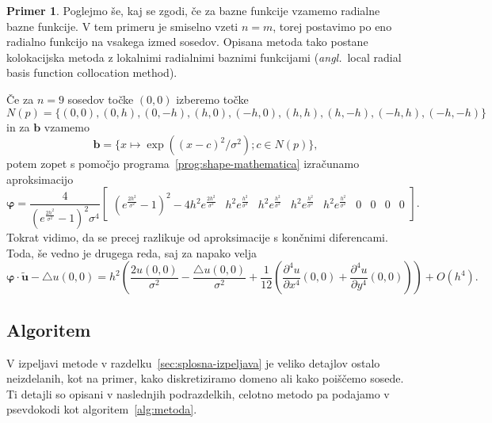 \documentclass[12pt,a4paper]{article}
\theoremstyle{definition} %
\newtheorem{primer}[definicija]{Primer}
\theoremstyle{plain} %
\numberwithin{equation}{section}
\renewcommand{\b}{\boldsymbol}
\renewcommand{\phi}{\varphi}
\newcommand{\dpar}[2]{\ensuremath{\frac{\partial #1}{\partial #2}}}
\newcommand{\ang}[1]{(\textit{angl.}\ #1)}
\begin{document}
\begin{primer}
\label{prim:rbf}
Poglejmo še, kaj se zgodi, če za bazne funkcije vzamemo radialne bazne funkcije.
V tem primeru je smiselno vzeti $n = m$, torej postavimo po eno radialno funkcijo
na vsakega izmed sosedov. Opisana metoda tako postane kolokacijska metoda z
lokalnimi radialnimi baznimi funkcijami \ang{local radial basis function
collocation method}.

Če za $n = 9$ sosedov točke $(0, 0)$ izberemo točke \[ N(p) = \{
  (0, 0), (0, h), (0, -h), (h, 0), (-h, 0), (h, h), (h, -h), (-h, h), (-h, -h)
\} \] in za $\b b$ vzamemo \[ \b b = \{ x\mapsto \exp((x-c)^2/\sigma^2); c \in N(p)
\}, \]
potem zopet s
pomočjo programa~\ref{prog:shape-mathematica} izračunamo aproksimacijo
\small
\[
  \b\phi =\frac{4}{(e^{\frac{2 h^2}{\sigma^2 }}-1)^2 \sigma^4}
\begin{bmatrix}
  (e^{\frac{2 h^2}{\sigma^2 }}-1)^2 -4h^2 e^{\frac{2 h^2}{\sigma^2 }} &
   h^2e^{\frac{h^2}{\sigma^2 }} & h^2e^{\frac{h^2}{\sigma^2 }} &
   h^2e^{\frac{h^2}{\sigma^2 }} & h^2e^{\frac{h^2}{\sigma^2 }} & 0 & 0 & 0 & 0
 \end{bmatrix}.
\]
\normalsize
Tokrat vidimo, da se precej razlikuje od aproksimacije s končnimi diferencami.
Toda, še vedno je drugega reda, saj za napako velja
\[
  \b \phi\cdot \b{\tilde{u}} - \triangle u(0, 0) =
  h^2\left(\frac{2u(0,0)}{\sigma^2} - \frac{\triangle u(0,0)}{\sigma^2} +
  \frac{1}{12}\left( \dpar{^4u}{x^4}(0,0) + \dpar{^4u}{y^4}(0, 0) \right)\right)
  + O(h^4).
\]
\end{primer}

\subsection{Algoritem}
V izpeljavi metode v razdelku~\ref{sec:splosna-izpeljava} je veliko detajlov
ostalo neizdelanih, kot na primer, kako diskretiziramo domeno ali kako poiščemo
sosede. Ti detajli so opisani v naslednjih podrazdelkih, celotno metodo pa podajamo v
psevdokodi kot algoritem~\ref{alg:metoda}.
\end{document}
